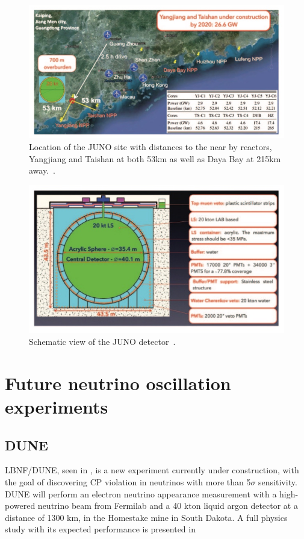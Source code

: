 \begin{figure}[h!]
  \centering
    \includegraphics[width=\textwidth]{figures/juno1.jpeg}
    \vspace{2mm}
    \caption{Location of the JUNO site with distances to the near by reactors, Yangjiang and Taishan at both 53km as well as Daya Bay at 215km away.~\cite{75Juno}.}
    \label{fig:juno1}
  \end{figure}
  \begin{figure}[h!]

    \includegraphics[width=\textwidth]{figures/juno2.jpeg}
       \vspace{2mm}
    \caption{Schematic view of the JUNO detector~\cite{75Juno}.}
     \label{fig:juno2}
\end{figure}

\section{Future neutrino oscillation experiments}

\subsection{DUNE}
LBNF/DUNE\cite{23DUNE}, seen in , is a new experiment currently under construction, with the goal of discovering CP violation in neutrinos with more than 5$\sigma$ sensitivity. DUNE will perform an electron neutrino appearance measurement with a high-powered neutrino beam from Fermilab and a 40 kton liquid argon detector at a distance of 1300 km, in the Homestake mine in South Dakota. A full physics study with its expected performance is presented in~\cite{76Dune}

